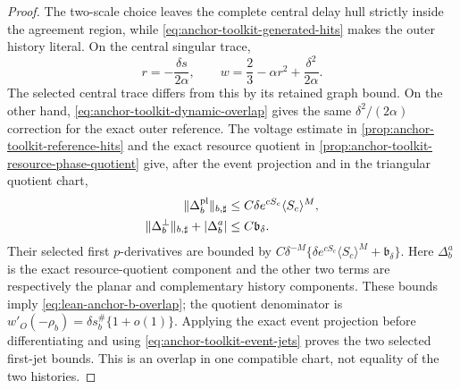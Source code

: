 \begin{proof}
The two-scale choice leaves the complete central delay hull strictly inside
the agreement region, while
\cref{eq:anchor-toolkit-generated-hits} makes the outer history literal.
On the central singular trace,
\[
 r=-\frac{\delta s}{2\alpha},\qquad
 w=\frac23-\alpha r^2+\frac{\delta^2}{2\alpha}.
\]
The selected central trace differs from this by its retained graph bound.
On the other hand, \cref{eq:anchor-toolkit-dynamic-overlap} gives the same
\(\delta^2/(2\alpha)\) correction for the exact outer reference.  The
voltage estimate in \cref{prop:anchor-toolkit-reference-hits} and the exact
resource quotient in \cref{prop:anchor-toolkit-resource-phase-quotient}
give, after the event projection and in the triangular quotient chart,
\begin{align*}
 \|\Delta_b^{\rm pl}\|_{b,\sharp}
 &\le C\delta e^{cS_c}\langle S_c\rangle^M,\\
 \|\Delta_b^{\perp}\|_{b,\sharp}+|\Delta_b^a|
 &\le C\mathfrak b_\delta .
\end{align*}
Their selected first \(p\)-derivatives are bounded by
\(C\delta^{-M}\{\delta e^{cS_c}\langle S_c\rangle^M+
\mathfrak b_\delta\}\).
Here \(\Delta_b^a\) is the exact resource-quotient component and the other
two terms are respectively the planar and complementary history
components.  These bounds imply \cref{eq:lean-anchor-b-overlap}; the
quotient denominator is
\(w'_O(-\rho_b)=\delta s_b^\#\{1+o(1)\}\).  Applying the exact event
projection before differentiating and using
\cref{eq:anchor-toolkit-event-jets} proves the two selected first-jet
bounds.  This is an overlap in one compatible chart, not equality of the
two histories.


\end{proof}
